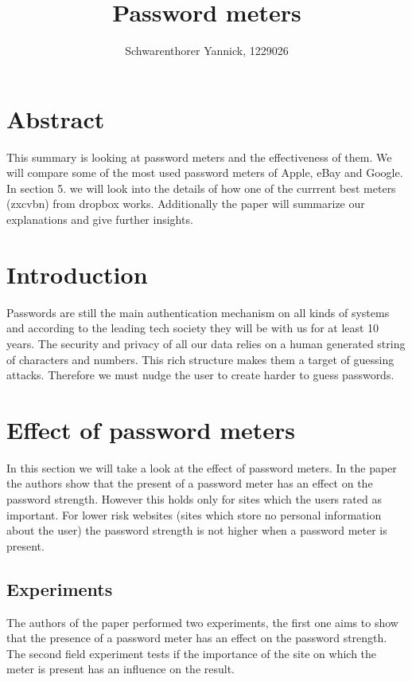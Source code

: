 \documentclass[12pt,a4paper]{article}
\author{Schwarenthorer Yannick, 1229026}
\title{\vspace{-3cm}Password meters}
\begin{document}
\maketitle


\section*{Abstract}
\label{sec:abstract}
This summary is looking at password meters and the effectiveness of them.
We will compare some of the most used password meters of Apple, eBay and Google. 
In section 5. we will look into the details of how one of the currrent best meters (zxcvbn) from dropbox works. Additionally the paper   will summarize our explanations and give further insights.



\section{Introduction}
\label{sec:introduction}
Passwords are still the main authentication mechanism on all kinds of systems and according to the leading tech society they will be with us for at least 10 years.
The security and privacy of all our data relies on a human generated string of characters and numbers.
This rich structure makes them a target of guessing attacks. Therefore we must nudge the user to create harder to guess passwords.

\section{Effect of password meters}

\label{sec:effect}
In this section we will take a look at the effect of password meters.
In the paper  \cite{upToEleven} the authors show that the present of a password meter has an effect on the password strength. However this holds only for sites which the users rated as important. For lower risk websites (sites which store no personal information about the user) the password strength is not higher when a password meter is present.


\subsection{Experiments}
The authors of the paper performed two experiments, the first one aims to show that the presence of a password meter has an effect on the password strength. The second field experiment tests if the importance of the site on which the meter is present has an influence on the result.
\end{document}
